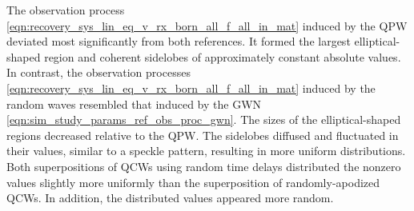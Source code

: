 The observation process
\eqref{eqn:recovery_sys_lin_eq_v_rx_born_all_f_all_in_mat} induced by
the \ac{QPW} deviated
most significantly from
both references.
It formed
the largest elliptical-shaped region and
coherent sidelobes of
approximately constant absolute values.
In contrast,
the observation processes
\eqref{eqn:recovery_sys_lin_eq_v_rx_born_all_f_all_in_mat} induced by
the random waves resembled
that induced by
the \ac{GWN}
\eqref{eqn:sim_study_params_ref_obs_proc_gwn}.
The sizes of
the elliptical-shaped regions decreased relative to
the \ac{QPW}.
The sidelobes diffused and
fluctuated in
their values, similar to
a speckle pattern, resulting in
more uniform distributions.
Both superpositions of
\acp{QCW} using
random time delays distributed
the nonzero values slightly more uniformly than
the superposition of
randomly-apodized \acp{QCW}.
In addition,
the distributed values appeared more random.


